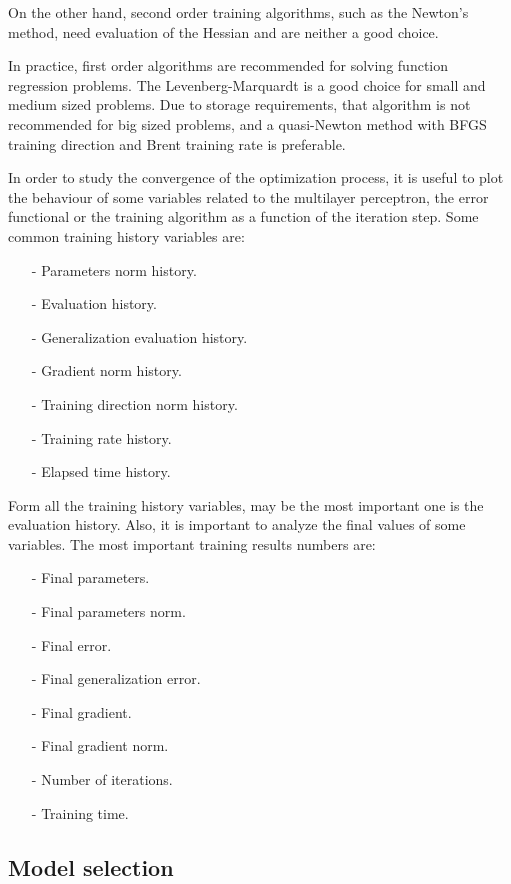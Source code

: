 On the other hand, second order training algorithms, such as the Newton's method, need evaluation of the Hessian and are neither a good choice. 

In practice, first order algorithms are recommended for solving function regression problems. The Levenberg-Marquardt is a good choice for small and medium sized problems. Due to storage requirements, that algorithm is not recommended for big sized problems, and a quasi-Newton method with BFGS training direction and Brent training rate is preferable. 

In order to study the convergence of the optimization process, it is useful to plot the behaviour of some variables related to the multilayer perceptron, the error functional or the training algorithm as a function of the iteration step. 
Some common training history variables are: 

\begin{itemize}
\item[-] Parameters norm history. 
\item[-] Evaluation history. 
\item[-] Generalization evaluation history. 
\item[-] Gradient norm history. 
\item[-] Training direction norm history. 
\item[-] Training rate history. 
\item[-] Elapsed time history.
\end{itemize}

Form all the training history variables, may be the most important one is the evaluation history. 
Also, it is important to analyze the final values of some variables. 
The most important training results numbers are: 

\begin{itemize}
\item[-] Final parameters. 
\item[-] Final parameters norm. 
\item[-] Final error. 
\item[-] Final generalization error. 
\item[-] Final gradient. 
\item[-] Final gradient norm. 
\item[-] Number of iterations. 
\item[-] Training time. 
\end{itemize}

\subsection*{Model selection}

